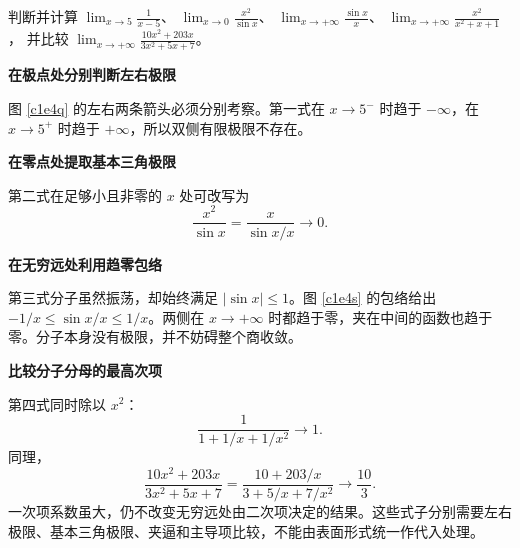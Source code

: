 \begin{question}
\begin{example}[不同形式的极限]
判断并计算
$\displaystyle\lim_{x\to5}\frac1{x-5}$、
$\displaystyle\lim_{x\to0}\frac{x^2}{\sin x}$、
$\displaystyle\lim_{x\to+\infty}\frac{\sin x}x$、
$\displaystyle\lim_{x\to+\infty}\frac{x^2}{x^2+x+1}$，
并比较 $\displaystyle\lim_{x\to+\infty}\frac{10x^2+203x}{3x^2+5x+7}$。
\end{example}
\end{question}
\begin{solution}\textbf{在极点处分别判断左右极限}\par\nobreak
图 \ref{c1e4q} 的左右两条箭头必须分别考察。第一式在 $x\to5^-$ 时趋于 $-\infty$，在 $x\to5^+$ 时趋于 $+\infty$，所以双侧有限极限不存在。



\par\medskip{}\noindent\textbf{在零点处提取基本三角极限}\par\nobreak
第二式在足够小且非零的 $x$ 处可改写为
\[
 \frac{x^2}{\sin x}=\frac{x}{\sin x/x}\longrightarrow0.
\]


\par\medskip{}\noindent\textbf{在无穷远处利用趋零包络}\par\nobreak
第三式分子虽然振荡，却始终满足 $|\sin x|\le1$。图 \ref{c1e4s} 的包络给出 $-1/x\le\sin x/x\le1/x$。两侧在 $x\to+\infty$ 时都趋于零，夹在中间的函数也趋于零。分子本身没有极限，并不妨碍整个商收敛。



\par\medskip{}\noindent\textbf{比较分子分母的最高次项}\par\nobreak
第四式同时除以 $x^2$：
\[
 \frac1{1+1/x+1/x^2}\longrightarrow\boxed1.
\]
同理，
\[
 \frac{10x^2+203x}{3x^2+5x+7}
 =\frac{10+203/x}{3+5/x+7/x^2}\longrightarrow\frac{10}3.
\]
一次项系数虽大，仍不改变无穷远处由二次项决定的结果。这些式子分别需要左右极限、基本三角极限、夹逼和主导项比较，不能由表面形式统一作代入处理。
\end{solution}

